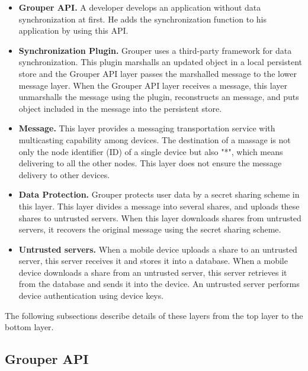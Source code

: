 \begin{itemize}
	\setlength{\itemsep}{1pt}
	\setlength{\parskip}{0pt}
	\setlength{\parsep}{0pt}
	\item \textbf{Grouper API.}
	A developer develops an application without data synchronization at first. 
	He adds the synchronization function to his application by using this API.
	\item \textbf{Synchronization Plugin.} 
	Grouper uses a third-party framework for data synchronization.
	This plugin marshalls an updated object in a local persistent store and the Grouper API layer passes the marshalled message to the lower message layer.
	When the Grouper API layer receives a message, this layer unmarshalls the message using the plugin, reconstructs an message, and puts object included in the message into the persistent store.
	\item \textbf{Message.}
	This layer provides a messaging transportation service with multicasting capability among devices.
	The destination of a massage is not only the node identifier (ID) of a single device but also "*", which means delivering to all the other nodes.
	This layer does not ensure the message delivery to other devices.
	\item \textbf{Data Protection.}
	Grouper protects user data by a secret sharing scheme in this layer.
	This layer divides a message into several shares, and uploads these shares to untrusted servers.
	When this layer downloads shares from untrusted servers, it recovers the original message using the secret sharing scheme.
	\item \textbf{Untrusted servers.}
	When a mobile device uploads a share to an untrusted server, this server receives it and stores it into a database.
	When a mobile device downloads a share from an untrusted server, this server retrieves it from the database and sends it into the device.
	An untrusted server performs device authentication using device keys.
\end{itemize}

The following subsections describe details of these layers from the top layer to the bottom layer.

\subsection{Grouper API}

